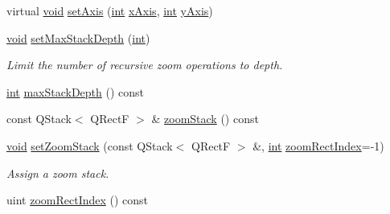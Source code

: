 \begin{DoxyCompactItemize}
virtual \hyperlink{group___u_a_v_objects_plugin_ga444cf2ff3f0ecbe028adce838d373f5c}{void} \hyperlink{class_qwt_plot_zoomer_a6cb755e06b83e50e8353dd706f7fb6f0}{set\-Axis} (\hyperlink{ioapi_8h_a787fa3cf048117ba7123753c1e74fcd6}{int} \hyperlink{class_qwt_plot_picker_a9cdd6d56e990173a00c6c81edbe8818d}{x\-Axis}, \hyperlink{ioapi_8h_a787fa3cf048117ba7123753c1e74fcd6}{int} \hyperlink{class_qwt_plot_picker_a3068fb734845abfdf5dff00ead18377f}{y\-Axis})
\item 
\hyperlink{group___u_a_v_objects_plugin_ga444cf2ff3f0ecbe028adce838d373f5c}{void} \hyperlink{class_qwt_plot_zoomer_a3965591944793790407ba91d6de3a882}{set\-Max\-Stack\-Depth} (\hyperlink{ioapi_8h_a787fa3cf048117ba7123753c1e74fcd6}{int})
\begin{DoxyCompactList}\small\item\em Limit the number of recursive zoom operations to depth. \end{DoxyCompactList}\item 
\hyperlink{ioapi_8h_a787fa3cf048117ba7123753c1e74fcd6}{int} \hyperlink{class_qwt_plot_zoomer_ac0d39d53af224cbeda37e0417d084dab}{max\-Stack\-Depth} () const 
\item 
const Q\-Stack$<$ Q\-Rect\-F $>$ \& \hyperlink{class_qwt_plot_zoomer_a3fd87611a5b3b263f26800b1008985ec}{zoom\-Stack} () const 
\item 
\hyperlink{group___u_a_v_objects_plugin_ga444cf2ff3f0ecbe028adce838d373f5c}{void} \hyperlink{class_qwt_plot_zoomer_afc12a6e757768a71d1c74b90931bfc70}{set\-Zoom\-Stack} (const Q\-Stack$<$ Q\-Rect\-F $>$ \&, \hyperlink{ioapi_8h_a787fa3cf048117ba7123753c1e74fcd6}{int} \hyperlink{class_qwt_plot_zoomer_a63797aa3b9e540a2c5f539fa34a05fbc}{zoom\-Rect\-Index}=-\/1)
\begin{DoxyCompactList}\small\item\em Assign a zoom stack. \end{DoxyCompactList}\item 
uint \hyperlink{class_qwt_plot_zoomer_a63797aa3b9e540a2c5f539fa34a05fbc}{zoom\-Rect\-Index} () const 
\end{DoxyCompactItemize}
